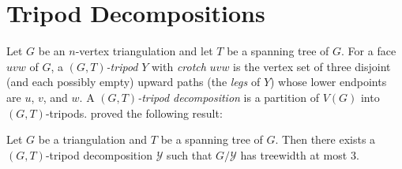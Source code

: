 \documentclass[a4paper,UKenglish,autoref]{lipics-v2021}
\begin{document}






%

\section{Tripod Decompositions}
\label{tripod_decompositions}

Let $G$ be an $n$-vertex triangulation and let $T$ be a spanning tree of $G$. For a face $uvw$ of $G$, a \emph{$(G,T)$-tripod} $Y$ with \emph{crotch} $uvw$ is the vertex set of three disjoint (and each possibly empty) upward paths (the \emph{legs} of $Y$) whose lower endpoints are $u$, $v$, and $w$.  A \emph{$(G,T)$-tripod decomposition} is a partition of $V(G)$ into $(G,T)$-tripods.  \citet{dujmovic.joret.ea:planar} proved the following result:

\begin{thm}\label{tripod_decomposition}
  Let $G$ be a triangulation and $T$ be a spanning tree of $G$.  Then there exists a $(G,T)$-tripod decomposition $\mathcal{Y}$ such that $G/\mathcal{Y}$ has treewidth at most $3$.
\end{thm}
\end{document}
